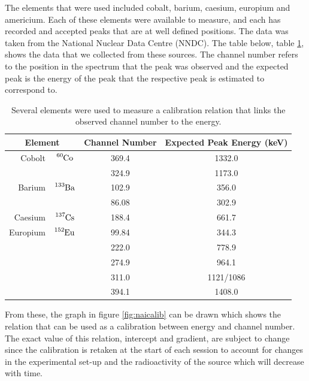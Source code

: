 The elements that were used included cobalt, barium, caesium, europium and americium. Each of these elements were available to measure, and each has recorded and accepted peaks that are at well defined positions. The data was taken from the National Nuclear Data Centre (NNDC)\cite{nndc}. The table below, table \ref{tab:calibdata}, shows the data that we collected from these sources. The channel number refers to the position in the spectrum that the peak was observed and the expected peak is the energy of the peak that the respective peak is estimated to correspond to.

\begin{table}[ht]
	\centering
	\begin{tabular}{r c|c|c}
		\multicolumn{2}{c|}{Element} & Channel Number & Expected Peak Energy (keV) \\
		\hline\hline
		Cobolt 		& $\ce{^{60}Co}$  & 369.4	& 1332.0 \\
					&				  & 324.9	& 1173.0	\\
		\hline
		Barium		& $\ce{^{133}Ba}$ & 102.9	& 356.0	\\
					&				  & 86.08	& 302.9		\\
		\hline
		Caesium		& $\ce{^{137}Cs}$ & 188.4	& 661.7 \\
		\hline
		Europium	& $\ce{^{152}Eu}$ & 99.84	& 344.3 \\
					&				  & 222.0	& 778.9		\\
					&				  & 274.9	& 964.1		\\
					&				  & 311.0	& 1121/1086	\\
					&				  & 394.1	& 1408.0	
	\end{tabular}
	\caption{Several elements were used to measure a calibration relation that links the observed channel number to the energy.\label{tab:calibdata}}
\end{table}
From these, the graph in figure \ref{fig:naicalib} can be drawn which shows the relation that can be used as a calibration between energy and channel number. The exact value of this relation, intercept and gradient, are subject to change since the calibration is retaken at the start of each session to account for changes in the experimental set-up and the radioactivity of the source which will decrease with time.

